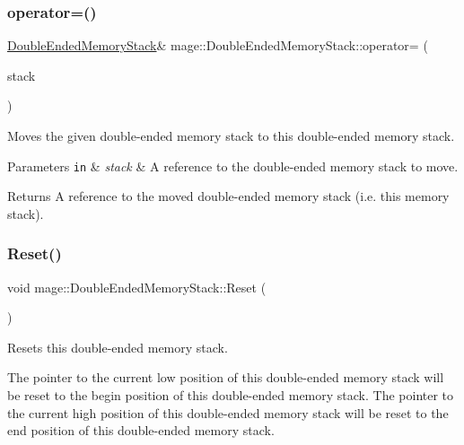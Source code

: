 \subsubsection{\texorpdfstring{operator=()}{operator=()}\hspace{0.1cm}{\footnotesize\ttfamily [2/2]}}
{\footnotesize\ttfamily \mbox{\hyperlink{classmage_1_1_double_ended_memory_stack}{Double\+Ended\+Memory\+Stack}}\& mage\+::\+Double\+Ended\+Memory\+Stack\+::operator= (\begin{DoxyParamCaption}\item[{\mbox{\hyperlink{classmage_1_1_double_ended_memory_stack}{Double\+Ended\+Memory\+Stack}} \&\&}]{stack }\end{DoxyParamCaption})\hspace{0.3cm}{\ttfamily [delete]}}

Moves the given double-\/ended memory stack to this double-\/ended memory stack.


\begin{DoxyParams}[1]{Parameters}
\mbox{\tt in}  & {\em stack} & A reference to the double-\/ended memory stack to move. \\
\hline
\end{DoxyParams}
\begin{DoxyReturn}{Returns}
A reference to the moved double-\/ended memory stack (i.\+e. this memory stack). 
\end{DoxyReturn}
\mbox{\label{classmage_1_1_double_ended_memory_stack_a99272e80cde12949a31a2942f9d009d6}} 
\subsubsection{\texorpdfstring{Reset()}{Reset()}}
{\footnotesize\ttfamily void mage\+::\+Double\+Ended\+Memory\+Stack\+::\+Reset (\begin{DoxyParamCaption}{ }\end{DoxyParamCaption})\hspace{0.3cm}{\ttfamily [noexcept]}}

Resets this double-\/ended memory stack.

The pointer to the current low position of this double-\/ended memory stack will be reset to the begin position of this double-\/ended memory stack. The pointer to the current high position of this double-\/ended memory stack will be reset to the end position of this double-\/ended memory stack. \mbox{\label{classmage_1_1_double_ended_memory_stack_a0c1981cb1fda455a02148f04be1c3ae8}} 
